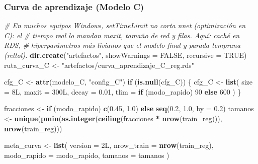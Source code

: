\documentclass[
]{article}
\newenvironment{Shaded}{\begin{snugshade}}{\end{snugshade}}
\newcommand{\AttributeTok}[1]{\textcolor[rgb]{0.13,0.29,0.53}{#1}}
\newcommand{\CommentTok}[1]{\textcolor[rgb]{0.56,0.35,0.01}{\textit{#1}}}
\newcommand{\ConstantTok}[1]{\textcolor[rgb]{0.56,0.35,0.01}{#1}}
\newcommand{\ControlFlowTok}[1]{\textcolor[rgb]{0.13,0.29,0.53}{\textbf{#1}}}
\newcommand{\DecValTok}[1]{\textcolor[rgb]{0.00,0.00,0.81}{#1}}
\newcommand{\FloatTok}[1]{\textcolor[rgb]{0.00,0.00,0.81}{#1}}
\newcommand{\FunctionTok}[1]{\textcolor[rgb]{0.13,0.29,0.53}{\textbf{#1}}}
\newcommand{\NormalTok}[1]{#1}
\newcommand{\OtherTok}[1]{\textcolor[rgb]{0.56,0.35,0.01}{#1}}
\newcommand{\SpecialCharTok}[1]{\textcolor[rgb]{0.81,0.36,0.00}{\textbf{#1}}}
\newcommand{\StringTok}[1]{\textcolor[rgb]{0.31,0.60,0.02}{#1}}
\begin{document}
\hypertarget{curva-de-aprendizaje-modelo-c}{%
\subsubsection{Curva de aprendizaje (Modelo
C)}\label{curva-de-aprendizaje-modelo-c}}

\begin{Shaded}
\begin{Highlighting}[]
\CommentTok{\# En muchos equipos Windows, setTimeLimit no corta nnet (optimización en C): el}
\CommentTok{\# tiempo real lo mandan maxit, tamaño de red y filas. Aquí: caché en RDS,}
\CommentTok{\# hiperparámetros más livianos que el modelo final y parada temprana (reltol).}
\FunctionTok{dir.create}\NormalTok{(}\StringTok{"artefactos"}\NormalTok{, }\AttributeTok{showWarnings =} \ConstantTok{FALSE}\NormalTok{, }\AttributeTok{recursive =} \ConstantTok{TRUE}\NormalTok{)}
\NormalTok{ruta\_curva\_C }\OtherTok{\textless{}{-}} \StringTok{"artefactos/curva\_aprendizaje\_C\_reg.rds"}

\NormalTok{cfg\_C }\OtherTok{\textless{}{-}} \FunctionTok{attr}\NormalTok{(modelo\_C, }\StringTok{"config\_C"}\NormalTok{)}
\ControlFlowTok{if}\NormalTok{ (}\FunctionTok{is.null}\NormalTok{(cfg\_C)) \{}
\NormalTok{  cfg\_C }\OtherTok{\textless{}{-}} \FunctionTok{list}\NormalTok{(}
    \AttributeTok{size =}\NormalTok{ 8L, }\AttributeTok{maxit =}\NormalTok{ 300L, }\AttributeTok{decay =} \FloatTok{0.01}\NormalTok{,}
    \AttributeTok{tlim =} \ControlFlowTok{if}\NormalTok{ (modo\_rapido) }\DecValTok{90} \ControlFlowTok{else} \DecValTok{600}
\NormalTok{  )}
\NormalTok{\}}

\NormalTok{fracciones }\OtherTok{\textless{}{-}} \ControlFlowTok{if}\NormalTok{ (modo\_rapido) }\FunctionTok{c}\NormalTok{(}\FloatTok{0.45}\NormalTok{, }\FloatTok{1.0}\NormalTok{) }\ControlFlowTok{else} \FunctionTok{seq}\NormalTok{(}\FloatTok{0.2}\NormalTok{, }\FloatTok{1.0}\NormalTok{, }\AttributeTok{by =} \FloatTok{0.2}\NormalTok{)}
\NormalTok{tamanos }\OtherTok{\textless{}{-}} \FunctionTok{unique}\NormalTok{(}\FunctionTok{pmin}\NormalTok{(}\FunctionTok{as.integer}\NormalTok{(}\FunctionTok{ceiling}\NormalTok{(fracciones }\SpecialCharTok{*} \FunctionTok{nrow}\NormalTok{(train\_reg))), }\FunctionTok{nrow}\NormalTok{(train\_reg)))}

\NormalTok{meta\_curva }\OtherTok{\textless{}{-}} \FunctionTok{list}\NormalTok{(}
  \AttributeTok{version =}\NormalTok{ 2L,}
  \AttributeTok{nrow\_train =} \FunctionTok{nrow}\NormalTok{(train\_reg),}
  \AttributeTok{modo\_rapido =}\NormalTok{ modo\_rapido,}
  \AttributeTok{tamanos =}\NormalTok{ tamanos}
\NormalTok{)}


\end{Highlighting}
\end{Shaded}
\end{document}
